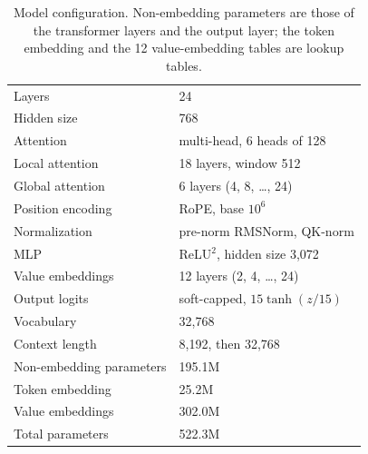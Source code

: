 \documentclass[sigconf,nonacm,balance=false]{acmart}
\begin{document}
\begin{table}
  \caption{Model configuration. Non-embedding parameters are those of the transformer layers and the output layer;
  the token embedding and the 12 value-embedding tables are lookup tables.}
  \label{tab:model}
  \small
  \begin{tabular}{ll}
    \toprule
    Layers & 24 \\
    Hidden size & 768 \\
    Attention & multi-head, 6 heads of 128 \\
    Local attention & 18 layers, window 512 \\
    Global attention & 6 layers (4, 8, \ldots, 24) \\
    Position encoding & RoPE, base $10^6$ \\
    Normalization & pre-norm RMSNorm, QK-norm \\
    MLP & ReLU$^2$, hidden size 3,072 \\
    Value embeddings & 12 layers (2, 4, \ldots, 24) \\
    Output logits & soft-capped, $15 \tanh(z / 15)$ \\
    Vocabulary & 32,768 \\
    Context length & 8,192, then 32,768 \\
    \midrule
    Non-embedding parameters & 195.1M \\
    Token embedding & 25.2M \\
    Value embeddings & 302.0M \\
    Total parameters & 522.3M \\
    \bottomrule
  \end{tabular}
\end{table}
\end{document}

